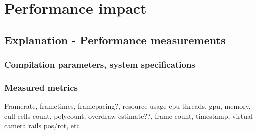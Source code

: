 
\chapter{Performance impact}

\section{Explanation - Performance measurements}
\subsection{Compilation parameters, system specifications}
\subsection{Measured metrics}
Framerate, frametimes, framepacing?, resource usage cpu threads, gpu, memory, cull cells count, polycount, overdraw estimate??, frame count, timestamp, virtual camera rails pos/rot, etc